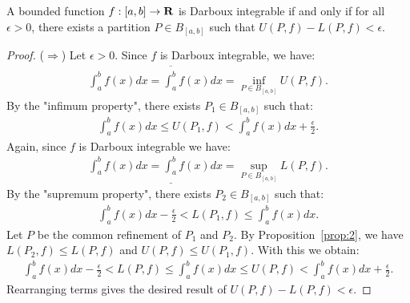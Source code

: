 \documentclass[11pt,twoside,openany]{memoir}
\begin{document}
    \begin{theorem}
        A bounded function $f:[a,b] \rightarrow \mathbf{R}$ is Darboux integrable if and only if for all $\epsilon > 0$, there exists a partition $P \in B_{[a,b]}$ such that $U(P,f) - L(P,f) < \epsilon$.
    \end{theorem}
        \begin{proof}
            ($\Rightarrow$) Let $\epsilon > 0$. Since $f$ is Darboux integrable, we have:
                \begin{equation*}
                \begin{split}
                    \int_a^b f(x)dx = \overline{\int_a^b}f(x)dx = \inf_{P \in B_{[a,b]}}U(P,f).
                \end{split}
                \end{equation*}
            By the "infimum property", there exists $P_1 \in B_{[a,b]}$ such that:
                \begin{equation*}
                \begin{split}
                    \int_a^b f(x)dx \leq U(P_1,f) < \int_a^b f(x)dx + \frac{\epsilon}{2}.
                \end{split}
                \end{equation*}
            Again, since $f$ is Darboux integrable we have:
                \begin{equation*}
                \begin{split}
                    \int_a^b f(x)dx = \underline{\int_a^b}f(x)dx = \sup_{P \in B_{[a,b]}}L(P,f).
                \end{split}
                \end{equation*}
            By the "supremum property", there exists $P_2 \in B_{[a,b]}$ such that:
                \begin{equation*}
                \begin{split}
                    \int_a^b f(x)dx - \frac{\epsilon}{2} < L(P_1,f) \leq \int_a^b f(x)dx .
                \end{split}
                \end{equation*}
            Let $P$ be the common refinement of $P_1$ and $P_2$. By Proposition~\ref{prop:2}, we have $L(P_2,f) \leq L(P,f)$ and $U(P,f) \leq U(P_1,f)$. With this we obtain:
                \begin{equation*}
                \begin{split}
                    \int_a^b f(x)dx - \frac{\epsilon}{2} < L(P,f) \leq \int_a^b f(x)dx \leq U(P,f) < \int_a^b f(x)dx + \frac{\epsilon}{2}.
                \end{split}
                \end{equation*}
            Rearranging terms gives the desired result of $U(P,f) - L(P,f) < \epsilon$.


\end{proof}
\end{document}
